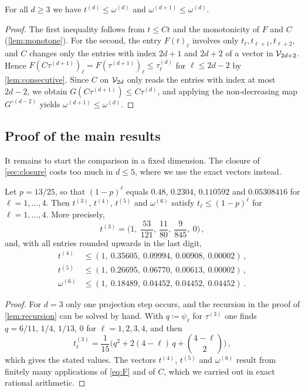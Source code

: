 \documentclass[11pt,letterpaper]{article}
\begin{document}
\begin{lemma}\label{lem:omega}
For all $d\ge3$ we have $t^{(d)}\le\omega^{(d)}$ and $\omega^{(d+1)}\le\omega^{(d)}$.
\end{lemma}

\begin{proof}
The first inequality follows from $t\le Ct$ and the monotonicity of $F$ and $C$ (\cref{lem:monotone}). For the second, the entry $F(t)_\ell$ involves only $t_\ell,t_{\ell+1},t_{\ell+2}$, and $C$ changes only the entries with index $2d+1$ and $2d+2$ of a vector in $\mathcal V_{2d+2}$. Hence $F(C\tau^{(d+1)})_\ell=F(\tau^{(d+1)})_\ell\le\tau^{(d)}_\ell$ for $\ell\le2d-2$ by \cref{lem:consecutive}. Since $C$ on $\mathcal V_{2d}$ only reads the entries with index at most $2d-2$, we obtain $G(C\tau^{(d+1)})\le C\tau^{(d)}$, and applying the non-decreasing map $G^{\circ(d-2)}$ yields $\omega^{(d+1)}\le\omega^{(d)}$.
\end{proof}

\subsection{Proof of the main results}\label{sec:proof-main}

It remains to start the comparison in a fixed dimension. The closure of \cref{sec:closure} costs too much in $d\le5$, where we use the exact vectors instead.

\begin{lemma}\label{lem:numbers}
Let $p=13/25$, so that $(1-p)^\ell$ equals $0.48$, $0.2304$, $0.110592$ and $0.05308416$ for $\ell=1,\dots,4$. Then $t^{(3)}$, $t^{(4)}$, $t^{(5)}$ and $\omega^{(6)}$ satisfy $t_\ell\le(1-p)^\ell$ for $\ell=1,\dots,4$. More precisely,
\begin{equation*}
t^{(3)}=\Big(1,\ \frac{53}{121},\ \frac{11}{80},\ \frac{9}{845},\ 0\Big)\,,
\end{equation*}
and, with all entries rounded upwards in the last digit,
\begin{align*}
t^{(4)}&\le(1,\ 0.35605,\ 0.09994,\ 0.00908,\ 0.00002)\,,\\
t^{(5)}&\le(1,\ 0.26695,\ 0.06770,\ 0.00613,\ 0.00002)\,,\\
\omega^{(6)}&\le(1,\ 0.18489,\ 0.04452,\ 0.04452,\ 0.04452)\,.
\end{align*}
\end{lemma}

\begin{proof}
For $d=3$ only one projection step occurs, and the recursion in the proof of \cref{lem:recursion} can be solved by hand. With $q\coloneqq\psi_\ell$ for $\tau^{(3)}$ one finds $q=6/11,\,1/4,\,1/13,\,0$ for $\ell=1,2,3,4$, and then
\begin{equation*}
t^{(3)}_\ell=\frac1{15}\Big(q^2+2(4-\ell)\,q+\binom{4-\ell}{2}\Big)\,,
\end{equation*}
which gives the stated values. The vectors $t^{(4)}$, $t^{(5)}$ and $\omega^{(6)}$ result from finitely many applications of \cref{eq:F} and of $C$, which we carried out in exact rational arithmetic.
\end{proof}
\end{document}
